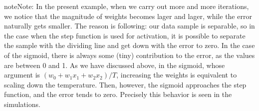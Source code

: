 \documentclass[letterpaper,10pt,english]{jupyterBook}
\begin{document}
\begin{sphinxVerbatim}[commandchars=\\\{\}]
 
 
 

   

\end{sphinxVerbatim}

\noindent{}

\begin{sphinxadmonition}{note}{Note:}
\sphinxAtStartPar
In the present example, when we carry out more and more iterations, we notice that the magnitude of weights becomes lager and lager, while the error naturally gets smaller. The reason is following: our data sample is separable, so in the case when the step function is used for activation, it is possible to separate the sample with the dividing line and get down with the error to zero. In the case of the sigmoid, there is always some (tiny) contribution to the error, as the values are between 0 and 1. As we have discussed above, in the sigmoid, whose argument is \( (w_0 + w_1 x_1 + w_2 x_2) / T\), increasing the weights is equivalent to scaling down the temperature. Then, however, the sigmoid approaches the step function, and the error tends to zero. Precisely this behavior is seen in the simulations.
\end{sphinxadmonition}
\end{document}
